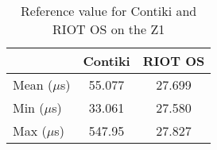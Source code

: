 \begin{table}[!ht]
  \centering
  \begin{tabular}{l|c|c}
                & Contiki & RIOT OS \\ \hline
  Mean ($\mu$s) & 55.077   & 27.699 \\
  Min  ($\mu$s) & 33.061 & 27.580 \\
  Max  ($\mu$s) & 547.95   & 27.827
  \end{tabular}
  \caption{Reference value for Contiki and RIOT OS on the Z1}
  \label{tab:reference-value-z1}
  \end{table}